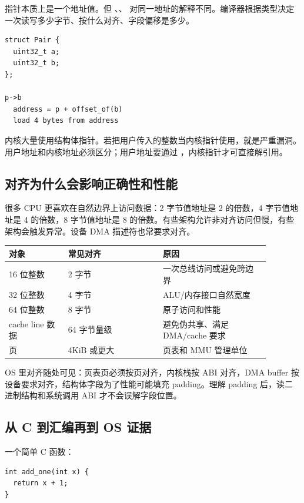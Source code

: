 指针本质上是一个地址值。但 、、 对同一地址的解释不同。编译器根据类型决定一次读写多少字节、按什么对齐、字段偏移是多少。

\begin{lstlisting}
struct Pair {
  uint32_t a;
  uint32_t b;
};

p->b
  address = p + offset_of(b)
  load 4 bytes from address
\end{lstlisting}

内核大量使用结构体指针。若把用户传入的整数当内核指针使用，就是严重漏洞。用户地址和内核地址必须区分；用户地址要通过 ，内核指针才可直接解引用。

\subsection{对齐为什么会影响正确性和性能}

很多 CPU 更喜欢在自然边界上访问数据：2 字节值地址是 2 的倍数，4 字节值地址是 4 的倍数，8 字节值地址是 8 的倍数。有些架构允许非对齐访问但慢，有些架构会触发异常。设备 DMA 描述符也常要求对齐。

\begin{longtable}{p{0.2\linewidth}p{0.32\linewidth}p{0.36\linewidth}}
\toprule
对象 & 常见对齐 & 原因 \\
\midrule
16 位整数 & 2 字节 & 一次总线访问或避免跨边界 \\
32 位整数 & 4 字节 & ALU/内存接口自然宽度 \\
64 位整数 & 8 字节 & 原子访问和性能 \\
cache line 数据 & 64 字节量级 & 避免伪共享、满足 DMA/cache 要求 \\
页 & 4KiB 或更大 & 页表和 MMU 管理单位 \\
\bottomrule
\end{longtable}

OS 里对齐随处可见：页表页必须按页对齐，内核栈按 ABI 对齐，DMA buffer 按设备要求对齐，结构体字段为了性能可能填充 padding。理解 padding 后，读二进制结构和系统调用 ABI 才不会误解字段位置。

\subsection{从 C 到汇编再到 OS 证据}

一个简单 C 函数：

\begin{lstlisting}
int add_one(int x) {
  return x + 1;
}
\end{lstlisting}

